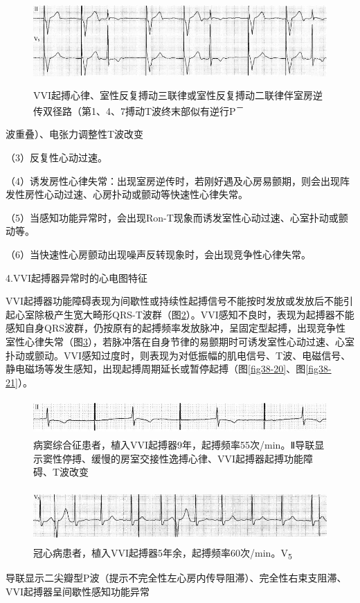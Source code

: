 \begin{figure}[!htbp]
 \centering
 \includegraphics[width=5.58333in,height=1.33333in]{./images/Image00620.jpg}
 \captionsetup{justification=centering}
 \caption{VVI起搏心律、室性反复搏动三联律或室性反复搏动二联律伴室房逆传双径路（第1、4、7搏动T波终末部似有逆行P\textsuperscript{－}}
 \label{fig38-17}
  \end{figure} 
波重叠）、电张力调整性T波改变

（3）反复性心动过速。

（4）诱发房性心律失常：出现室房逆传时，若刚好遇及心房易颤期，则会出现阵发性房性心动过速、心房扑动或颤动等快速性心律失常。

（5）当感知功能异常时，会出现Ron-T现象而诱发室性心动过速、心室扑动或颤动等。

（6）当快速性心房颤动出现噪声反转现象时，会出现竞争性心律失常。

4.VVI起搏器异常时的心电图特征

VVI起搏器功能障碍表现为间歇性或持续性起搏信号不能按时发放或发放后不能引起心室除极产生宽大畸形QRS-T波群（图\ref{fig38-18}）。VVI感知不良时，表现为起搏器不能感知自身QRS波群，仍按原有的起搏频率发放脉冲，呈固定型起搏，出现竞争性室性心律失常（图\ref{fig38-19}），若脉冲落在自身节律的易颤期时可诱发室性心动过速、心室扑动或颤动。VVI感知过度时，则表现为对低振幅的肌电信号、T波、电磁信号、静电磁场等发生感知，出现起搏周期延长或暂停起搏（图\ref{fig38-20}、图\ref{fig38-21}）。

\begin{figure}[!htbp]
 \centering
 \includegraphics[width=5.58333in,height=0.54167in]{./images/Image00621.jpg}
 \captionsetup{justification=centering}
 \caption{病窦综合征患者，植入VVI起搏器9年，起搏频率55次/min。Ⅱ导联显示窦性停搏、缓慢的房室交接性逸搏心律、VVI起搏器起搏功能障碍、T波改变}
 \label{fig38-18}
  \end{figure} 

\begin{figure}[!htbp]
 \centering
 \includegraphics[width=5.58333in,height=0.82292in]{./images/Image00622.jpg}
 \captionsetup{justification=centering}
 \caption{冠心病患者，植入VVI起搏器5年余，起搏频率60次/min。V\textsubscript{5}}
 \label{fig38-19}
  \end{figure} 
导联显示二尖瓣型P波（提示不完全性左心房内传导阻滞）、完全性右束支阻滞、VVI起搏器呈间歇性感知功能异常

